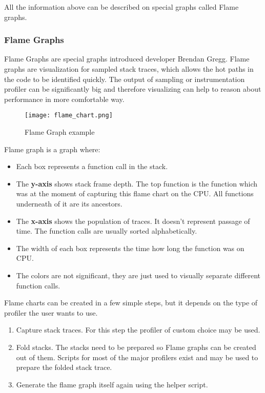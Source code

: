 All the information above can be described on special graphs called Flame graphs.
\subsubsection{Flame Graphs}
Flame Graphs are special graphs introduced developer Brendan Gregg. Flame graphs are visualization for sampled stack traces, which allows the hot paths in the code to be identified quickly. The output of sampling or instrumentation profiler can be significantly big and therefore visualizing can help to reason about performance in more comfortable way. 

\begin{figure}
	\centering
	\texttt{[image: flame\_chart.png]}
	\caption{Flame Graph example}
	\label{fig:flame_chart}
\end{figure}
Flame graph is a graph where:
\begin{itemize}
	\item Each box represents a function call in the stack.
	\item The \textbf{y-axis} shows stack frame depth. The top function is the function which was at the moment of capturing this flame chart on the CPU. All functions underneath of it are its ancestors.
	\item The \textbf{x-axis} shows the population of traces. It doesn't represent passage of time. The function calls are usually sorted alphabetically.
	\item The width of each box represents the time how long the function was on CPU.
	\item The colors are not significant, they are just used to visually separate different function calls.
\end{itemize}

Flame charts can be created in a few simple steps, but it depends on the type of profiler the user wants to use. 
\begin{enumerate}
	\item Capture stack traces. For this step the profiler of custom choice may be used.
	\item Fold stacks. The stacks need to be prepared so Flame graphs can be created out of them. Scripts for most of the major profilers exist and may be used to prepare the folded stack trace.
	\item Generate the flame graph itself again using the helper script.
\end{enumerate}

